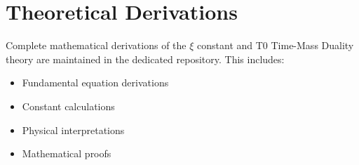 	\appendix
	\section{Theoretical Derivations}
	
	Complete mathematical derivations of the $\xi$ constant and T0 Time-Mass Duality theory are maintained in the dedicated repository. This includes:
	
	\begin{itemize}
		\item Fundamental equation derivations
		\item Constant calculations
		\item Physical interpretations
		\item Mathematical proofs
	\end{itemize}
